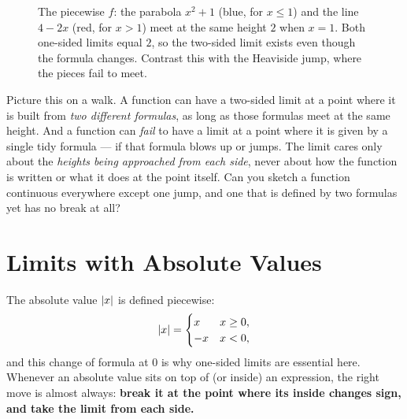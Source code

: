 \begin{figure}[htbp]
\centering
{}
\caption{The piecewise $f$: the parabola $x^2+1$ (blue, for $x\le 1$) and the
line $4-2x$ (red, for $x>1$) meet at the same height $2$ when $x=1$. Both
one-sided limits equal $2$, so the two-sided limit exists even though the
formula changes. Contrast this with the Heaviside jump, where the pieces fail
to meet.}
\label{ch07:fig-piecewise}
\end{figure}

\begin{walkbox}
Picture this on a walk. A function can have a two-sided
limit at a point where it is built from \emph{two different formulas}, as long
as those formulas meet at the same height. And a function can \emph{fail} to
have a limit at a point where it is given by a single tidy formula --- if that
formula blows up or jumps. The limit cares only about the \emph{heights being
approached from each side}, never about how the function is written or what it
does at the point itself. Can you sketch a function continuous everywhere
except one jump, and one that is defined by two formulas yet has no break at all?
\end{walkbox}

\section{Limits with Absolute Values}
\label{ch07:absvalue}

The absolute value $\lvert x\rvert$ is defined piecewise:
\[
  \lvert x\rvert = \begin{cases} x & x \ge 0,\\ -x & x < 0,\end{cases}
\]
and this change of formula at $0$ is why one-sided limits are essential here. Whenever an absolute value sits on top of (or inside) an
expression, the right move is almost always: \textbf{break it at the point
where its inside changes sign, and take the limit from each side.}

